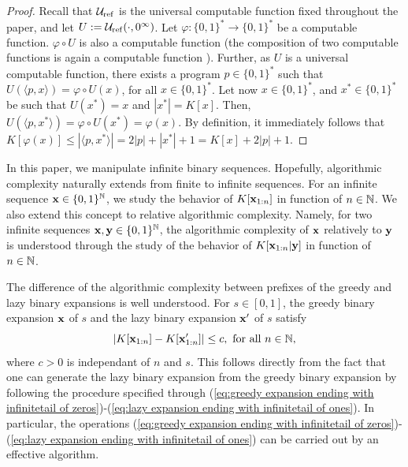 \begin{proof}
	Recall that $\mathcal{U}_{\operatorname{ref}}$ is the universal computable function fixed throughout the paper, and let $U := \mathcal{U}_{\operatorname{ref}}(\cdot, 0^\infty)$. Let $\varphi : \{0,1\}^\ast \to \{0,1\}^\ast$ be a computable function. $\varphi \circ U$ is also a computable function (the composition of two computable functions is again a computable function \cite[Exercise 2.1.2]{lovasz2018notes}). Further, as $U$ is a universal computable function, there exists a program $p\in \{0,1\}^\ast$ such that $U(\langle p, x \rangle) = \varphi \circ U(x)$, for all $x \in \{0,1\}^\ast$. Let now $x \in \{0,1\}^\ast$, and $x^\ast \in \{0,1\}^\ast$ be such that $U(x^\ast) = x$ and $|x^\ast| = K[x]$. Then, $U(\langle p, x^\ast \rangle) = \varphi \circ U(x^\ast) = \varphi(x)$. By definition, it immediately follows that $K[\varphi(x)] \leq |\langle p, x^\ast\rangle| = 2|p| + |x^\ast| + 1 = K[x] + 2|p| + 1$.
\end{proof}

In this paper, we manipulate infinite binary sequences. Hopefully, algorithmic complexity naturally extends from finite to infinite sequences. For an infinite sequence ${\bf x} \in \{0,1\}^{\mathbb{N}}$, we study the behavior of $K[{\bf x}_{1:n}]$ in function of $n \in \mathbb{N}$. We also extend this concept to relative algorithmic complexity. Namely, for two infinite sequences ${\bf x}, {\bf y} \in \{0,1\}^{\mathbb{N}}$, the algorithmic complexity of ${\bf x}$ relatively to ${\bf y}$ is understood through the study of the behavior of $K[{\bf x}_{1:n}|{\bf y}]$ in function of $n \in \mathbb{N}$.

The difference of the algorithmic complexity between prefixes of the greedy and lazy binary expansions is well understood. For $s \in [0,1]$, the greedy binary expansion ${\bf x}$ of $s$ and the lazy binary expansion ${\bf x}'$ of $s$ satisfy
\begin{equation}\label{eq:comparison between the kolmogorov complexity of the greedy and lazy expansions}
	|K[{\bf x}_{1:n}] - K[{\bf x}'_{1:n}]| \leq c, \ \text{for all} \ n \in \mathbb{N},
\end{equation}
where $c > 0$ is independant of $n$ and $s$. This follows directly from the fact that one can generate the lazy binary expansion from the greedy binary expansion by following the procedure specified through (\ref{eq:greedy expansion ending with infinitetail of zeros})-(\ref{eq:lazy expansion ending with infinitetail of ones}). In particular, the operations (\ref{eq:greedy expansion ending with infinitetail of zeros})-(\ref{eq:lazy expansion ending with infinitetail of ones}) can be carried out by an effective algorithm. 

